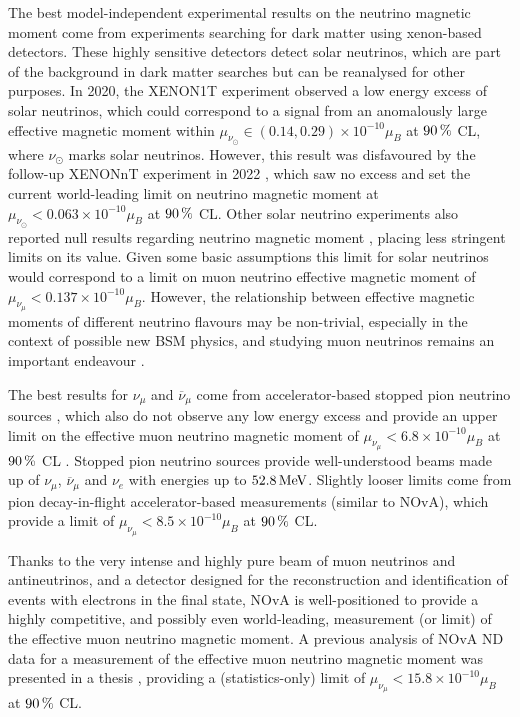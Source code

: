 \documentclass[12pt]{article}
\begin{document}
The best model-independent experimental results on the neutrino magnetic moment come from experiments searching for dark matter using xenon-based detectors. These highly sensitive detectors detect solar neutrinos, which are part of the background in dark matter searches but can be reanalysed for other purposes. In 2020, the XENON1T experiment observed \cite{XENON1TExcessNuOnE2020.pdf} a low energy excess of solar neutrinos, which could correspond to a signal from an anomalously large effective magnetic moment within $\mu_{\nu_\odot}\in \left(0.14, 0.29\right)\times 10^{-10} \mu_B$ at $\unit[90]{\%}$ \gls{CL}, where $\nu_\odot$ marks solar neutrinos. However, this result was disfavoured by the follow-up XENONnT experiment in 2022 \cite{XENONnTFirstResults2022.pdf}, which saw no excess and set the current world-leading limit on neutrino magnetic moment at $\mu_{\nu_\odot}<0.063\times 10^{-10}\mu_B$ at $\unit[90]{\%}$ \gls{CL}. Other solar neutrino experiments also reported null results regarding neutrino magnetic moment \cite{LZNuMMResults2022.pdf,BorexinoLimit2017.pdf}, placing less stringent limits on its value. Given some basic assumptions \cite{BorexinoLimit2017.pdf, KhanXENONnTImplications2022.pdf} this limit for solar neutrinos would correspond to a limit on muon neutrino effective magnetic moment of $\mu_{\nu_\mu}<0.137\times 10^{-10}\mu_B$. However, the relationship between effective magnetic moments of different neutrino flavours may be non-trivial, especially in the context of possible new \gls{BSM} physics, and studying muon neutrinos remains an important endeavour \cite{LargeNuMMJointFit2022.pdf}.

The best results for $\nu_\mu$ and $\overline{\nu}_\mu$ come from accelerator-based stopped pion neutrino sources \cite{LSNDLimits2001.pdf,LAMPFAMuNuMM1990.pdf}, which also do not observe any low energy excess and provide an upper limit on the effective muon neutrino magnetic moment of $\mu_{\nu_\mu}<6.8\times 10^{-10}\mu_B$  at $\unit[90]{\%}$ \gls{CL} \cite{LSNDLimits2001.pdf}. Stopped pion neutrino sources provide well-understood beams made up of $\nu_\mu$, $\overline{\nu}_\mu$ and $\nu_e$ with energies up to $\unit[52.8]{MeV}$. Slightly looser limits come from pion decay-in-flight accelerator-based measurements (similar to \gls{NOvA})\cite{NuoneForEMProp1990.pdf, Charm2MuonNuMM1995.pdf}, which provide a limit of $\mu_{\nu_\mu}<8.5\times 10^{-10}\mu_B$ at $\unit[90]{\%}$ \gls{CL}.

Thanks to the very intense and highly pure beam of muon neutrinos and antineutrinos, and a detector designed for the reconstruction and identification of events with electrons in the final state, \gls{NOvA} is well-positioned to provide a highly competitive, and possibly even world-leading, measurement (or limit) of the effective muon neutrino magnetic moment. A previous analysis of \gls{NOvA} \gls{ND} data for a measurement of the effective muon neutrino magnetic moment was presented in a thesis \cite{nuMM-thesis-biaow.pdf}, providing a (statistics-only) limit of $\mu_{\nu_\mu}<15.8\times 10^{-10}\mu_B$ at $\unit[90]{\%}$ \gls{CL}.
\end{document}
